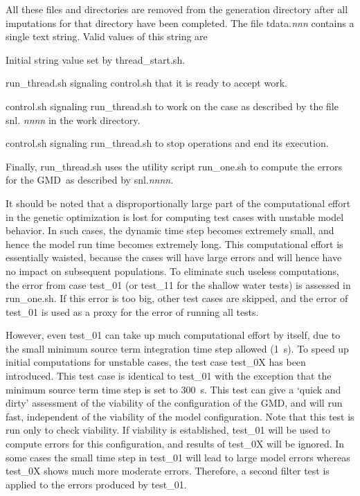 \documentclass[12pt]{article}
\newcommand{\gmd}{GMD}
\newcommand{\file}{\sf}
\newcommand{\code}{\tt}
\newenvironment{plist}{\begin{list}{nofile ?}{\parsep 0mm
            \itemsep 0mm \leftmargin 35mm \labelwidth 25mm
            \rightmargin 10mm}}{\end{list}}
\newcommand{\pit}[2]{\item[{\code{#1}}\hfill]{#2}}
\begin{document}
\noindent
All these files and directories are removed from the generation directory
after all imputations for that directory have been completed.  The file {\file
tdata.{\it nnn}} contains a single text string. Valid values of this string
are

\begin{plist}
\pit{starting}      {Initial string value set by {\file thread\_start.sh}.}
\pit{ready to go} {{\file run\_thread.sh} signaling {\file control.sh} that it
                     is ready to accept work.}
\pit{snl.{\it nnnn}}{{\file control.sh} signaling {\file run\_thread.sh} to
                      work on the case as described by the file {\file snl.{\it
                      nnnn}} in the work directory.}
\pit{done}           {{\file control.sh} signaling {\file run\_thread.sh} to
                     stop operations and end its execution.}
\end{plist}

\noindent
Finally, {\file run\_thread.sh} uses the utility script {\file run\_one.sh} to
compute the errors for the \gmd\ as described by {\file snl.{\it nnnn}}. 

\vspace{\baselineskip}
\noindent
It should be noted that a disproportionally large part of the computational
effort in the genetic optimization is lost for computing test cases with
unstable model behavior. In such cases, the dynamic time step becomes
extremely small, and hence the model run time becomes extremely long. This
computational effort is essentially waisted, because the cases will have large
errors and will hence have no impact on subsequent populations. To eliminate
such useless computations, the error from case {\file test\_01} (or {\file
test\_11} for the shallow water tests) is assessed in {\file run\_one.sh}. If
this error is too big, other test cases are skipped, and the error of {\file
test\_01} is used as a proxy for the error of running all tests.

However, even {\file test\_01} can take up much computational effort by
itself, due to the small minimum source term integration time step allowed
(1~s). To speed up initial computations for unstable cases, the test case
{\file test\_0X} has been introduced. This test case is identical to {\file
test\_01} with the exception that the minimum source term time step is set to
300~s. This test can give a `quick and dirty' assessment of the viability of
the configuration of the GMD, and will run fast, independent of the viability
of the model configuration. Note that this test is run only to check
viability. If viability is established, {\file test\_01} will be used to
compute errors for this configuration, and results of {\file test\_0X} will be
ignored. In some cases the small time step in {\file test\_01} will lead to
large model errors whereas {\file test\_0X} shows much more moderate
errors. Therefore, a second filter test is applied to the errors produced by
{\file test\_01}.
\end{document}
